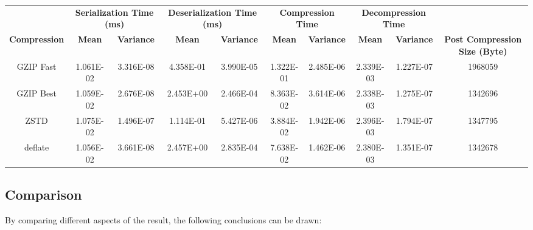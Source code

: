 \begin{table}[H]
\centering
\begin{tabular}{cccccccccc}
\hline
 &
  \multicolumn{2}{c}{\textbf{Serialization Time (ms)}} &
  \multicolumn{2}{c}{\textbf{Deserialization Time (ms)}} &
  \multicolumn{2}{c}{\textbf{Compression Time}} &
  \multicolumn{2}{c}{\textbf{Decompression Time}} &
   \\
\textbf{Compression} & \textbf{Mean}     & \textbf{Variance} & \textbf{Mean}     & \textbf{Variance} & \textbf{Mean}     & \textbf{Variance} & \textbf{Mean}     & \textbf{Variance} & \textbf{Post Compression Size (Byte)} \\
\hline
GZIP Fast           & 1.061E-02 & 3.316E-08 & 4.358E-01 & 3.990E-05 & 1.322E-01 & 2.485E-06 & 2.339E-03 & 1.227E-07 & 1968059 \\
GZIP Best           & 1.059E-02 & 2.676E-08 & 2.453E+00 & 2.466E-04 & 8.363E-02 & 3.614E-06 & 2.338E-03 & 1.275E-07 & 1342696 \\
ZSTD                & 1.075E-02 & 1.496E-07 & 1.114E-01 & 5.427E-06 & 3.884E-02 & 1.942E-06 & 2.396E-03 & 1.794E-07 & 1347795 \\
deflate             & 1.056E-02 & 3.661E-08 & 2.457E+00 & 2.835E-04 & 7.638E-02 & 1.462E-06 & 2.380E-03 & 1.351E-07 & 1342678 \\
\hline
\end{tabular}
\end{table}

\subsection{Comparison}
By comparing different aspects of the result, the following conclusions can be drawn: 

